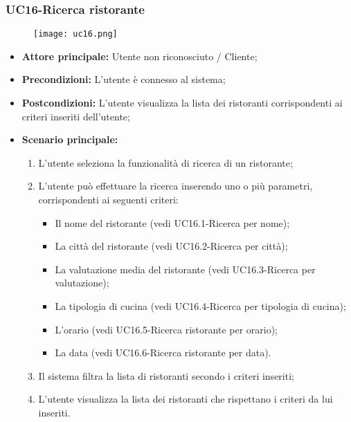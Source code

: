 \subsubsection{UC16-Ricerca ristorante}
\begin{figure}[h] \texttt{[image: uc16.png]} \end{figure}
\begin{itemize}
\item \textbf{Attore principale:} Utente non riconosciuto / Cliente;
\item \textbf{Precondizioni:} L'utente è connesso al sistema;
\item \textbf{Postcondizioni:} L'utente visualizza la lista dei ristoranti corrispondenti ai criteri inseriti dell'utente;
\item \textbf{Scenario principale:}
\begin{enumerate}
    \item L'utente seleziona la funzionalità di ricerca di un ristorante;
    \item L'utente può effettuare la ricerca inserendo uno o più parametri, corrispondenti ai seguenti criteri:
    \begin{itemize}
        \item Il nome del ristorante (vedi UC16.1-Ricerca per nome);
        \item La città del ristorante (vedi UC16.2-Ricerca per città);
        \item La valutazione media del ristorante (vedi UC16.3-Ricerca per valutazione);
        \item La tipologia di cucina (vedi UC16.4-Ricerca per tipologia di cucina);
        \item L'orario (vedi UC16.5-Ricerca ristorante per orario);
        \item La data (vedi UC16.6-Ricerca ristorante per data).
    \end{itemize}
    \item Il sistema filtra la lista di ristoranti secondo i criteri inseriti;
    \item L'utente visualizza la lista dei ristoranti che rispettano i criteri da lui inseriti.
\end{enumerate}
\end{itemize}

